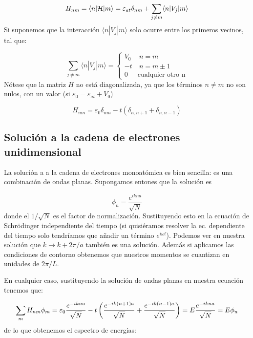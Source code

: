 \begin{equation}
	H_{nm} = \langle n | \mathcal{H} | m \rangle = \varepsilon_{at} \delta_{nm}+\sum_{j\neq m} \langle n |V_j |m\rangle
\end{equation}
Si suponemos que la interacción $\langle n | V_j | m \rangle$ solo ocurre entre los primeros vecinos, tal que:

\begin{equation}
	\sum_{j\neq m} \langle n |V_j |m\rangle = \left\lbrace \begin{array}{lc}
		V_0 & \ n=m \\
		-t & \ n=m\pm 1 \\
		 0 & \text{cualquier otro n}
	\end{array} \right.
\end{equation}
Nótese que la matriz $H$ no está diagonalizada, ya que los términos $n\neq m$ no son nulos, con un valor (si $\varepsilon_0 = \varepsilon_{at}+V_0$)

\begin{equation}
	H_{nm} = \varepsilon_0 \delta_{nm} - t(\delta_{n,n+1}+\delta_{n,n-1})
\end{equation}

\subsection{Solución a la cadena de electrones unidimensional}

La solución a a la cadena de electrones monoatómica es bien sencilla: es una combinación de ondas planas. Supongamos entones que la solución es

\begin{equation}
	\phi_n = \frac{e^{ikna}}{\sqrt{N}}
\end{equation}
donde el $1/\sqrt{N}$ es el factor de normalización. Sustituyendo esto en la ecuación de Schrödinger independiente del tiempo (si quisiéramos resolver la ec. dependiente del tiempo solo tendríamos que añadir un término $e^{i\omega t}$). Podemos ver en nuestra solución que $k\rightarrow k + 2 \pi /a$ también es una solución. Además si aplicamos las condiciones de contorno obtenemos que nuestros momentos se cuantizan en unidades de $2\pi /L$. 

En cualquier caso, sustituyendo la solución de ondas planas en nuestra ecuación tenemos que:

\begin{equation}
	\sum_m H_{nm} \phi_m = \varepsilon_0 \frac{e^{-ikna}}{\sqrt{N}} - t \left( \frac{e^{-ik(n+1)a}}{\sqrt{N}}+\frac{e^{-ik(n-1)a}}{\sqrt{N}} \right) = E \frac{e^{-ikna}}{\sqrt{N}} = E\phi_n
\end{equation}
de lo que obtenemos el espectro de energías:

